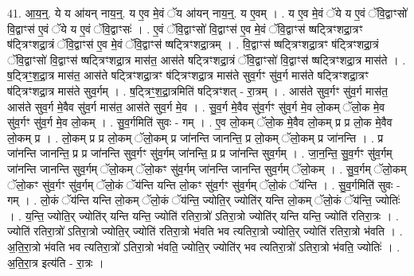 \documentclass[17pt]{extarticle}
\begin{document}
41. आ॒य॒न्॒. ये य आ॑यन् नाय॒न्॒. य ए॒व मे॒वं ॅय आ॑यन् नाय॒न्॒. य ए॒वम् । . य ए॒व मे॒वं ॅये य ए॒वं ॅवि॒द्वाꣳसो॑ वि॒द्वाꣳस॑ ए॒वं ॅये य ए॒वं ॅवि॒द्वाꣳसः॑ । . ए॒वं ॅवि॒द्वाꣳसो॑ वि॒द्वाꣳस॑ ए॒व मे॒वं ॅवि॒द्वाꣳस॑ ष्षट्त्रिꣳशद्रा॒त्रꣳ ष॑ट्त्रिꣳशद्रा॒त्रं ॅवि॒द्वाꣳस॑ ए॒व मे॒वं ॅवि॒द्वाꣳस॑ ष्षट्त्रिꣳशद्रा॒त्रम् । . वि॒द्वाꣳस॑ ष्षट्त्रिꣳशद्रा॒त्रꣳ ष॑ट्त्रिꣳशद्रा॒त्रं ॅवि॒द्वाꣳसो॑ वि॒द्वाꣳस॑ ष्षट्त्रिꣳशद्रा॒त्र मास॑त॒ आस॑ते षट्त्रिꣳशद्रा॒त्रं ॅवि॒द्वाꣳसो॑ वि॒द्वाꣳस॑ ष्षट्त्रिꣳशद्रा॒त्र मास॑ते । . ष॒ट्त्रिꣳ॒॒श॒द्रा॒त्र मास॑त॒ आस॑ते षट्त्रिꣳशद्रा॒त्रꣳ ष॑ट्त्रिꣳशद्रा॒त्र मास॑ते सुव॒र्गꣳ सु॑व॒र्ग मास॑ते षट्त्रिꣳशद्रा॒त्रꣳ ष॑ट्त्रिꣳशद्रा॒त्र मास॑ते सुव॒र्गम् । . ष॒ट्त्रिꣳ॒॒श॒द्रा॒त्रमिति॑ षट्त्रिꣳशत् - रा॒त्रम् । . आस॑ते सुव॒र्गꣳ सु॑व॒र्ग मास॑त॒ आस॑ते सुव॒र्ग मे॒वैव सु॑व॒र्ग मास॑त॒ आस॑ते सुव॒र्ग मे॒व । . सु॒व॒र्ग मे॒वैव सु॑व॒र्गꣳ सु॑व॒र्ग मे॒व लो॒कम् ॅलो॒क मे॒व सु॑व॒र्गꣳ सु॑व॒र्ग मे॒व लो॒कम् । . सु॒व॒र्गमिति॑ सुवः - गम् । . ए॒व लो॒कम् ॅलो॒क मे॒वैव लो॒कम् प्र प्र लो॒क मे॒वैव लो॒कम् प्र । . लो॒कम् प्र प्र लो॒कम् ॅलो॒कम् प्र जा॑नन्ति जानन्ति॒ प्र लो॒कम् ॅलो॒कम् प्र जा॑नन्ति । . प्र जा॑नन्ति जानन्ति॒ प्र प्र जा॑नन्ति सुव॒र्गꣳ सु॑व॒र्गम् जा॑नन्ति॒ प्र प्र जा॑नन्ति सुव॒र्गम् । . जा॒न॒न्ति॒ सु॒व॒र्गꣳ सु॑व॒र्गम् जा॑नन्ति जानन्ति सुव॒र्गम् ॅलो॒कम् ॅलो॒कꣳ सु॑व॒र्गम् जा॑नन्ति जानन्ति सुव॒र्गम् ॅलो॒कम् । . सु॒व॒र्गम् ॅलो॒कम् ॅलो॒कꣳ सु॑व॒र्गꣳ सु॑व॒र्गम् ॅलो॒कं ॅय॑न्ति यन्ति लो॒कꣳ सु॑व॒र्गꣳ सु॑व॒र्गम् ॅलो॒कं ॅय॑न्ति । . सु॒व॒र्गमिति॑ सुवः - गम् । . लो॒कं ॅय॑न्ति यन्ति लो॒कम् ॅलो॒कं ॅय॑न्ति॒ ज्योति॒र् ज्योति॑र् यन्ति लो॒कम् ॅलो॒कं ॅय॑न्ति॒ ज्योतिः॑ । . य॒न्ति॒ ज्योति॒र् ज्योति॑र् यन्ति यन्ति॒ ज्योति॑ रतिरा॒त्रो॑ ऽतिरा॒त्रो ज्योति॑र् यन्ति यन्ति॒ ज्योति॑ रतिरा॒त्रः । . ज्योति॑ रतिरा॒त्रो॑ ऽतिरा॒त्रो ज्योति॒र् ज्योति॑ रतिरा॒त्रो भ॑वति भव त्यतिरा॒त्रो ज्योति॒र् ज्योति॑ रतिरा॒त्रो भ॑वति । . अ॒ति॒रा॒त्रो भ॑वति भव त्यतिरा॒त्रो॑ ऽतिरा॒त्रो भ॑वति॒ ज्योति॒र् ज्योति॑र् भव त्यतिरा॒त्रो॑ ऽतिरा॒त्रो भ॑वति॒ ज्योतिः॑ । . अ॒ति॒रा॒त्र इत्य॑ति - रा॒त्रः । \newline
\pagebreak
{}
\end{document}
